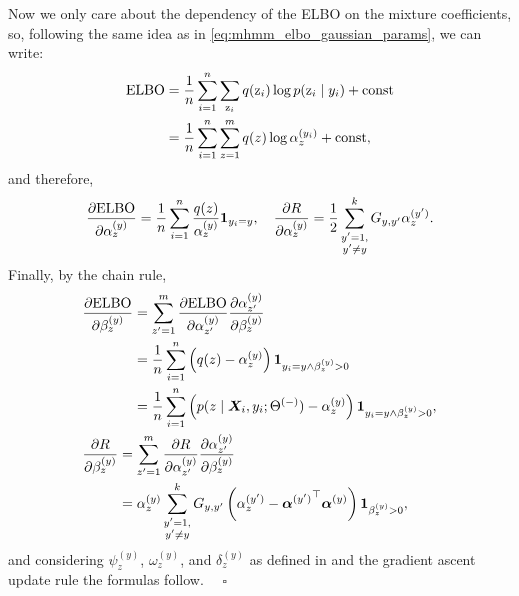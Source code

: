 Now we only care about the dependency of the ELBO on the mixture coefficients, so, following the same idea as in \eqref{eq:mhmm_elbo_gaussian_params}, we can write:
\begin{align}
	\mathrm{ELBO} &= \frac{1}{n}\sum_{i=1}^n \sum_{{\textnormal{z}}_i} q({\textnormal{z}}_i) \log p({\textnormal{z}}_i \mid y_i) + \text{const} \nonumber\\
	&= \frac{1}{n}\sum_{i=1}^n \sum_{z=1}^m q(z) \log {\alpha}^{(y_i)}_{z} + \text{const},
\end{align}
and therefore,
\begin{equation}
	\frac{\partial \mathrm{ELBO}}{\partial {\alpha}^{(y)}_{z}} = \frac{1}{n}\sum_{i=1}^n \frac{q(z)}{{\alpha}^{(y)}_{z}} \bm{1}_{y_i=y}, \quad
	\frac{\partial R}{\partial {\alpha}^{(y)}_{z}} = \frac{1}{2}\sum_{\substack{y'=1,\\y'\neq y}}^{k} {G}_{y,y'} {\alpha}^{(y')}_{z}.
\end{equation}
Finally, by the chain rule,
\begin{align}
	&\frac{\partial \mathrm{ELBO}}{\partial \evbeta^{(y)}_{z}} = \sum_{z'=1}^{m} \frac{\partial \mathrm{ELBO}}{\partial \evalpha^{(y)}_{z'}} \frac{\partial \evalpha^{(y)}_{z'}}{\partial \evbeta^{(y)}_{z}} \nonumber\\
	&\hphantom{\frac{\partial \mathrm{ELBO}}{\partial \evbeta^{(y)}_{z}}} = \frac{1}{n} \sum_{i=1}^n \left(q(z) - \evalpha^{(y)}_{z}\right) \1_{y_i = y \wedge \evbeta^{(y)}_{z} > 0} \nonumber\\
	&\hphantom{\frac{\partial \mathrm{ELBO}}{\partial \evbeta^{(y)}_{z}}} = \frac{1}{n} \sum_{i=1}^n \left(p(z \mid \mX_i, y_i; \Theta^{(-)}) - \evalpha^{(y)}_{z}\right) \1_{y_i = y \wedge \evbeta^{(y)}_{z} > 0}, \\
	&\frac{\partial R}{\partial \evbeta^{(y)}_{z}} = \sum_{z'=1}^{m} \frac{\partial R}{\partial \evalpha^{(y)}_{z'}} \frac{\partial \evalpha^{(y)}_{z'}}{\partial \evbeta^{(y)}_{z}} \nonumber\\
	&\hphantom{\frac{\partial R}{\partial \evbeta^{(y)}_{z}}} = \evalpha^{(y)}_{z} \sum_{\substack{y'=1,\\y'\neq y}}^{k} \emG_{y,y'} \left(\evalpha^{(y')}_{z} - {\valpha^{(y')}} \transp \valpha^{(y)} \right) \1_{\evbeta^{(y)}_{z} > 0},
\end{align}
and considering $\psi^{(y)}_{z}$, $\omega^{(y)}_{z}$, and $\delta^{(y)}_z$ as defined in  and the gradient ascent update rule the formulas follow. $\quad \square$

